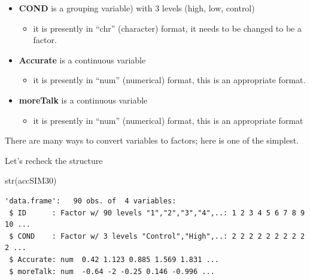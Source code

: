 \documentclass[
  11pt,
]{book}
\newenvironment{Shaded}{\begin{snugshade}}{\end{snugshade}}
\newcommand{\CommentTok}[1]{\textcolor[rgb]{0.56,0.35,0.01}{\textit{#1}}}
\newcommand{\FunctionTok}[1]{\textcolor[rgb]{0.00,0.00,0.00}{#1}}
\newcommand{\NormalTok}[1]{#1}
\newcommand{\OtherTok}[1]{\textcolor[rgb]{0.56,0.35,0.01}{#1}}
\newcommand{\SpecialCharTok}[1]{\textcolor[rgb]{0.00,0.00,0.00}{#1}}
\providecommand{\tightlist}{%
  \setlength{\itemsep}{0pt}\setlength{\parskip}{0pt}}
\begin{document}
\begin{itemize}
\tightlist
\item
  \textbf{COND} is a grouping variable) with 3 levels (high, low, control)

  \begin{itemize}
  \tightlist
  \item
    it is presently in ``chr'' (character) format, it needs to be changed to be a factor.
  \end{itemize}
\item
  \textbf{Accurate} is a continuous variable

  \begin{itemize}
  \tightlist
  \item
    it is presently in ``num'' (numerical) format, this is an appropriate format.
  \end{itemize}
\item
  \textbf{moreTalk} is a continuous variable

  \begin{itemize}
  \tightlist
  \item
    it is presently in ``num'' (numerical) format, this is an appropriate format
  \end{itemize}
\end{itemize}

There are many ways to convert variables to factors; here is one of the simplest.

\begin{Shaded}
\end{Shaded}

Let's recheck the structure

\begin{Shaded}
\begin{Highlighting}[]
\FunctionTok{str}\NormalTok{(accSIM30)}
\end{Highlighting}
\end{Shaded}

\begin{verbatim}
'data.frame':   90 obs. of  4 variables:
 $ ID      : Factor w/ 90 levels "1","2","3","4",..: 1 2 3 4 5 6 7 8 9 10 ...
 $ COND    : Factor w/ 3 levels "Control","High",..: 2 2 2 2 2 2 2 2 2 2 ...
 $ Accurate: num  0.42 1.123 0.885 1.569 1.831 ...
 $ moreTalk: num  -0.64 -2 -0.25 0.146 -0.996 ...
\end{verbatim}
\end{document}
